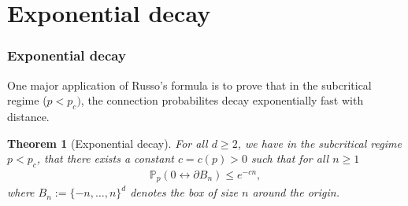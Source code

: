 \documentclass[compress,mathserif,serif]{beamer}
\newtheorem{thm}{Theorem}
\begin{document}
\section{Exponential decay}


\begin{frame}
\begin{center}
\Huge{}
\end{center}
\end{frame}

\begin{frame}
\frametitle{Exponential decay}
One major application of Russo's formula is to prove that in the subcritical regime ($p <p_c)$, the connection probabilites decay exponentially fast with distance. 
\pause
\begin{thm}[Exponential decay] For all $d \geq 2$, we have in the subcritical regime $p < p_c$, that there exists a constant $c=c(p)>0$ such that for all $n \geq 1$
\begin{align*}
\mathbb{P}_p( 0 \longleftrightarrow \partial B_n) \leq e^{-cn},
\end{align*}
where $B_n:= \{-n, \dots , n \}^d$ denotes the box of size $n$ around the origin. 
\end{thm}
\end{frame}


\begin{frame}
\begin{center}
\Huge{}
\end{center}
\end{frame}


\begin{frame}
\
\end{frame}




\end{document}
